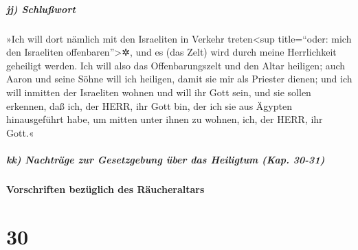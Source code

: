\hypertarget{jj-schluuxdfwort}{%
\subparagraph{jj) Schlußwort}\label{jj-schluuxdfwort}}

 »Ich will dort nämlich mit den Israeliten in Verkehr
treten\textless sup title=``oder: mich den Israeliten
offenbaren''\textgreater✲, und es (das Zelt) wird durch meine
Herrlichkeit geheiligt werden.  Ich will also das
Offenbarungszelt und den Altar heiligen; auch Aaron und seine Söhne will
ich heiligen, damit sie mir als Priester dienen;  und ich
will inmitten der Israeliten wohnen und will ihr Gott sein,
 und sie sollen erkennen, daß ich, der HERR, ihr Gott
bin, der ich sie aus Ägypten hinausgeführt habe, um mitten unter ihnen
zu wohnen, ich, der HERR, ihr Gott.«

\hypertarget{kk-nachtruxe4ge-zur-gesetzgebung-uxfcber-das-heiligtum-kap.-30-31}{%
\subparagraph{kk) Nachträge zur Gesetzgebung über das Heiligtum (Kap.
30-31)}\label{kk-nachtruxe4ge-zur-gesetzgebung-uxfcber-das-heiligtum-kap.-30-31}}

\hypertarget{vorschriften-bezuxfcglich-des-ruxe4ucheraltars}{%
\paragraph{Vorschriften bezüglich des
Räucheraltars}\label{vorschriften-bezuxfcglich-des-ruxe4ucheraltars}}

\hypertarget{section-29}{%
\section{30}\label{section-29}}

